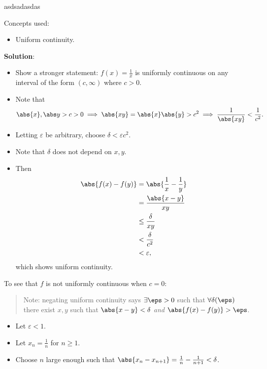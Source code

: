 \begin{solution}

\begin{theorem}[asdsads]

asdsadasdas

\end{theorem}

Concepts used:

\begin{itemize}
\tightlist
\item
  Uniform continuity.
\end{itemize}

\textbf{Solution}:

\begin{itemize}
\item
  Show a stronger statement: \(f(x) = \frac 1 x\) is uniformly
  continuous on any interval of the form \((c, \infty)\) where
  \(c > 0\).
\item
  Note that
  \begin{align*}
  \abs{x}, \abs y > c > 0 \implies \abs{xy} = \abs{x}\abs{y} > c^2 \implies \frac{1}{\abs{xy}} < \frac 1 {c^{2}}
  .\end{align*}
\item
  Letting \(\varepsilon\) be arbitrary, choose
  \(\delta < \varepsilon c^2\).
\item
  Note that \(\delta\) does not depend on \(x, y\).
\item
  Then
  \begin{align*}
  \abs{f(x) - f(y)}
  &= \abs{\frac 1 x - \frac 1 y} \\
  &= \frac{\abs{x-y}}{xy} \\
  &\leq \frac{\delta}{xy} \\
  &< \frac{\delta}{c^2} \\
  &< \varepsilon
  ,\end{align*} which shows uniform continuity.
\end{itemize}

To see that \(f\) is not uniformly continuous when \(c=0\):

\begin{quote}
Note: negating uniform continuity says \(\exists \eps > 0\) such that
\(\forall \delta(\eps)\) there exist \(x, y\) such that
\(\abs{x-y} < \delta\) \emph{and} \(\abs{f(x) - f(y)} > \eps\).
\end{quote}

\begin{itemize}
\tightlist
\item
  Let \(\varepsilon < 1\).
\item
  Let \(x_n = \frac 1 n\) for \(n\geq 1\).
\item
  Choose \(n\) large enough such that
  \(\abs{x_n - x_{n+1}} = \frac 1 n - \frac 1 {n+1} < \delta\).


\end{itemize}
\end{solution}

